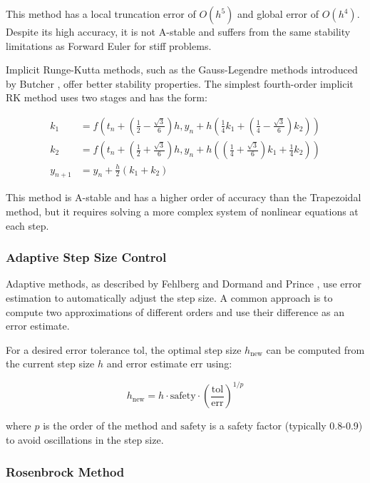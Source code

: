 \documentclass[11pt,a4paper]{article}
\begin{document}
This method has a local truncation error of $O(h^5)$ and global error of $O(h^4)$. Despite its high accuracy, it is not A-stable and suffers from the same stability limitations as Forward Euler for stiff problems.

Implicit Runge-Kutta methods, such as the Gauss-Legendre methods introduced by Butcher \cite{butcher1964implicit}, offer better stability properties. The simplest fourth-order implicit RK method uses two stages and has the form:

\begin{align}
k_1 &= f\left(t_n + \left(\frac{1}{2} - \frac{\sqrt{3}}{6}\right)h, y_n + h\left(\frac{1}{4}k_1 + \left(\frac{1}{4} - \frac{\sqrt{3}}{6}\right)k_2\right)\right) \\
k_2 &= f\left(t_n + \left(\frac{1}{2} + \frac{\sqrt{3}}{6}\right)h, y_n + h\left(\left(\frac{1}{4} + \frac{\sqrt{3}}{6}\right)k_1 + \frac{1}{4}k_2\right)\right) \\
y_{n+1} &= y_n + \frac{h}{2}(k_1 + k_2)
\end{align}

This method is A-stable and has a higher order of accuracy than the Trapezoidal method, but it requires solving a more complex system of nonlinear equations at each step.

\subsubsection{Adaptive Step Size Control}

Adaptive methods, as described by Fehlberg \cite{fehlberg1969low} and Dormand and Prince \cite{dormand1980family}, use error estimation to automatically adjust the step size. A common approach is to compute two approximations of different orders and use their difference as an error estimate.

For a desired error tolerance $\text{tol}$, the optimal step size $h_{\text{new}}$ can be computed from the current step size $h$ and error estimate $\text{err}$ using:

\begin{equation}
h_{\text{new}} = h \cdot \text{safety} \cdot \left(\frac{\text{tol}}{\text{err}}\right)^{1/p}
\end{equation}

where $p$ is the order of the method and $\text{safety}$ is a safety factor (typically 0.8-0.9) to avoid oscillations in the step size.

\subsubsection{Rosenbrock Method}
\end{document}
